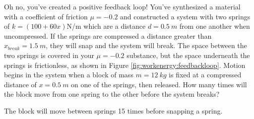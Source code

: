 \question Oh no, you've created a positive feedback loop! You've synthesized a material with a coefficient of friction $\mu = -0.2$ and constructed a system with two springs of $k = (100+60x)$N/m which are a distance $d = \SI{0.5}{m}$ from one another when uncompressed. If the springs are compressed a distance greater than $x_{break} = \SI{1.5}{m}$, they will snap and the system will break. The space between the two springs is covered in your $\mu = -0.2$ substance, but the space underneath the springs is frictionless, as shown in Figure \ref{fig:workenergy:feedbackloop}. Motion begins in the system when a block of mass $m = \SI{12}{kg}$ is fixed at a compressed distance of $x = \SI{0.5}{m}$ on one of the springs, then released. How many times will the block move from one spring to the other before the system breaks?
\begin{finalanswer}
	The block will move between springs 15 times before snapping a spring.
\end{finalanswer}

